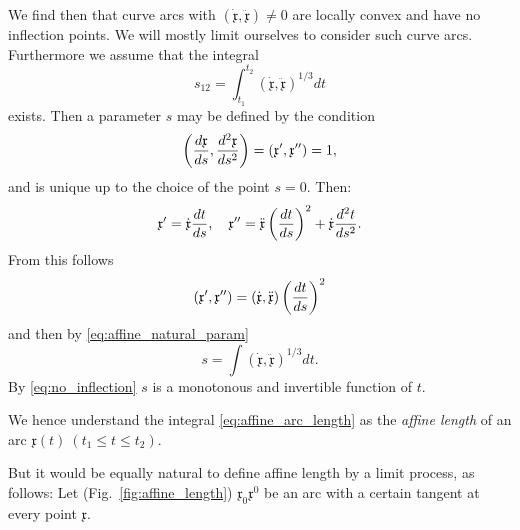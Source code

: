 \documentclass[11pt]{book} \usepackage{amssymb}
\newcommand{\myvec}[1]{\mathfrak{#1}}
\newcommand{\vecx}{\myvec{x}}
\newcommand{\vecderiv}[1]{\dot{\myvec{#1}}}
\newcommand{\vecderivv}[1]{\ddot{\myvec{#1}}}
\begin{document}
We find then that curve arcs with $(\vecderiv{x},\vecderivv{x})\neq 0$ are 
locally convex and have no inflection points. We will mostly limit ourselves
to consider such curve arcs. Furthermore we assume that the integral
\begin{equation}
  \label{eq:affine_arc_length}
  s_{12}=\int_{t_1}^{t_2}(\vecderiv{x},\vecderivv{x})^{1/3}dt
\end{equation}
exists. Then a parameter $s$ may be defined by the condition
\begin{equation}
  \label{eq:affine_natural_param}
  \left({d\vecx\over ds},{d^2\vecx\over ds^2}\right)=
  (\vecx',\vecx'')=1,
\end{equation}
and is unique up to the choice of the point $s=0$. Then:
\begin{equation}
  \label{eq:param_transform}
  \vecx'=\vecderiv{x}{dt\over ds},\quad 
  \vecx''=\vecderivv{x}\left({dt\over ds}\right)^2+\vecderiv{x}{d^2t\over ds^2}.
\end{equation}
From this follows
\begin{equation}
  \label{eq:affine_deriv_transform1}
  (\vecx',\vecx'')=(\vecderiv{x},\vecderivv{x})\left({}dt\over ds\right)^2
\end{equation}
and then by \eqref{eq:affine_natural_param}
\begin{equation}
  \label{eq:affine_arc_length2}
  s=\int(\vecderiv{x},\vecderivv{x})^{1/3}dt.
\end{equation}
By \eqref{eq:no_inflection} $s$ is a monotonous and invertible function of $t$.

We hence understand the integral \eqref{eq:affine_arc_length} as the 
{\em affine length} of an arc $\vecx(t)\:(t_1\leq t \leq t_2)$.

But it would be equally natural to define affine length by a limit process, 
as follows: Let (Fig.~\ref{fig:affine_length}) $\vecx_0\vecx^0$ be an
arc with a certain tangent at every point $\vecx$.  

 
\end{document}
